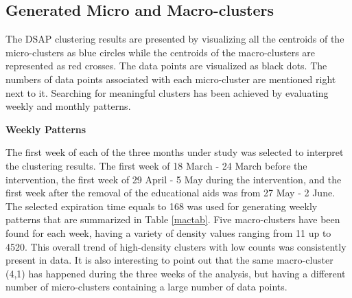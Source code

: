 \subsection{Generated Micro and Macro-clusters}

The DSAP clustering results are presented by visualizing all the centroids of the micro-clusters as blue circles while the centroids of the macro-clusters are represented as red crosses. The data points are visualized as black dots. The numbers of data points associated with each micro-cluster are mentioned right next to it. Searching for meaningful clusters has been achieved by evaluating weekly and monthly patterns.


\textbf{Weekly Patterns}

The first week of each of the three months under study was selected to interpret the clustering results. The first week of 18 March - 24 March before the intervention, the first week of 29 April - 5 May during the intervention, and the first week after the removal of the educational aids was from 27 May - 2 June. The selected expiration time equals to 168 was used for generating weekly patterns that are summarized in Table \ref{mactab}. Five macro-clusters have been found for each week, having a variety of density values ranging from 11 up to 4520. This overall trend of high-density clusters with low counts was consistently present in data. It is also interesting to point out that the same macro-cluster (4,1) has happened during the three weeks of the analysis, but having a different number of micro-clusters containing a large number of data points. 

